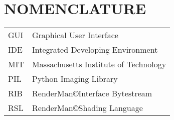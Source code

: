 %
%
%


\chapter*{NOMENCLATURE}

\begin{tabular}{ll}
GUI & Graphical User Interface\tabularnewline
IDE & Integrated Developing Environment \tabularnewline
MIT & Massachusetts Institute of Technology \tabularnewline
PIL & Python Imaging Library\tabularnewline
RIB  & RenderMan\copyright Interface Bytestream\tabularnewline
RSL & RenderMan\copyright Shading Language\tabularnewline
\end{tabular}

\vspace{2em}

\pagebreak{} 